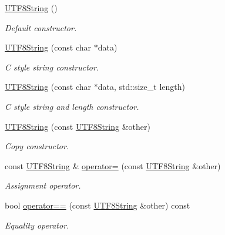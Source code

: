 \begin{DoxyCompactItemize}
\item 
\hyperlink{classchaos_1_1uni_1_1_u_t_f8_string_a09647f0ade81a97ed55c75b9070b07a3}{U\+T\+F8\+String} ()
\begin{DoxyCompactList}\small\item\em Default constructor. \end{DoxyCompactList}\item 
\hyperlink{classchaos_1_1uni_1_1_u_t_f8_string_abb9cf9e655e1285179e47c698cfb1c56}{U\+T\+F8\+String} (const char $\ast$data)
\begin{DoxyCompactList}\small\item\em C style string constructor. \end{DoxyCompactList}\item 
\hyperlink{classchaos_1_1uni_1_1_u_t_f8_string_a2f9c060bed3206c69d2ab05f37e07b8c}{U\+T\+F8\+String} (const char $\ast$data, std\+::size\+\_\+t length)
\begin{DoxyCompactList}\small\item\em C style string and length constructor. \end{DoxyCompactList}\item 
\hyperlink{classchaos_1_1uni_1_1_u_t_f8_string_adabf7e6406a70581690a2b190143d01d}{U\+T\+F8\+String} (const \hyperlink{classchaos_1_1uni_1_1_u_t_f8_string}{U\+T\+F8\+String} \&other)
\begin{DoxyCompactList}\small\item\em Copy constructor. \end{DoxyCompactList}\item 
const \hyperlink{classchaos_1_1uni_1_1_u_t_f8_string}{U\+T\+F8\+String} \& \hyperlink{classchaos_1_1uni_1_1_u_t_f8_string_a9ff3d9661b17bbc979cc82d967c76c13}{operator=} (const \hyperlink{classchaos_1_1uni_1_1_u_t_f8_string}{U\+T\+F8\+String} \&other)
\begin{DoxyCompactList}\small\item\em Assignment operator. \end{DoxyCompactList}\item 
bool \hyperlink{classchaos_1_1uni_1_1_u_t_f8_string_af6f79ccd70af381eb6feba5fe3a3b2d0}{operator==} (const \hyperlink{classchaos_1_1uni_1_1_u_t_f8_string}{U\+T\+F8\+String} \&other) const 
\begin{DoxyCompactList}\small\item\em Equality operator. \end{DoxyCompactList}\item 

\end{DoxyCompactItemize}
